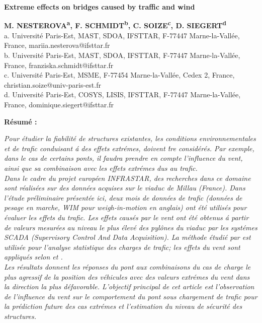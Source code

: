 \documentclass[11pt,a4paper]{article}
\begin{document}



\begin{center}
\begin{spacing}{2.05}
{\fontsize{20}{20}
\bf
Extreme effects on bridges caused by traffic and wind
}
\end{spacing}
\end{center}
\vspace{-1.25cm}
\begin{center}
{\fontsize{14}{20}
\bf
M. NESTEROVA\textsuperscript{a}, F. SCHMIDT\textsuperscript{b}, C. SOIZE\textsuperscript{c}, D. SIEGERT\textsuperscript{d}\\
\bigskip
}
{\fontsize{12}{20}
a. Universit\'e Paris-Est, MAST, SDOA, IFSTTAR, F-77447 Marne-la-Vall\'ee, France, mariia.nesterova@ifsttar.fr\\
b. Universit\'e Paris-Est, MAST, SDOA, IFSTTAR, F-77447 Marne-la-Vall\'ee, France, franziska.schmidt@ifsttar.fr\\
c. Universit\'e Paris-Est, MSME, F-77454 Marne-la-Vall\'ee, Cedex 2, France, christian.soize@univ-paris-est.fr\\
d. Universit\'e Paris-Est, COSYS, LISIS, IFSTTAR, F-77447 Marne-la-Vall\'ee, France, dominique.siegert@ifsttar.fr\\
}
\end{center}

\vspace{10pt}

{\fontsize{16}{20}
\bf
R\'esum\'e :
}
\medskip

\textit{%
Pour \'etudier la fiabilit\'e de structures existantes, les conditions environnementales et de trafic conduisant \'a des effets extr\'emes, doivent \'tre consid\'er\'es. Par exemple, dans le cas de certains ponts, il faudra prendre en compte l'influence du vent, ainsi que sa combinaison avec les effets extr\'emes dus au trafic.\\
Dans le cadre du projet europ\'een INFRASTAR, des recherches dans ce domaine sont r\'ealis\'ees sur des donn\'ees acquises sur le viaduc de Millau (France). Dans l'\'etude pr\'eliminaire pr\'esent\'ee ici, deux mois de donn\'ees de trafic (donn\'ees de pesage en marche, WIM pour weigh-in-motion en anglais) ont \'et\'e utilis\'es pour \'evaluer les effets du trafic. Les effets caus\'es par le vent ont \'et\'e obtenus \'a partir de valeurs mesur\'ees au niveau le plus \'elev\'e des pyl\^ones du viaduc par les syst\'emes SCADA (Supervisory Control And Data Acquisition). La m\'ethode \'etudi\'e par \cite{Zhou2013} est utilis\'ee pour l'analyse statistique des charges de trafic; les effets du vent sont appliqu\'es selon \cite{Zhang2014} et \cite{Arena2014}.\\
Les r\'esultats donnent les r\'eponses du pont aux combinaisons du cas de charge le plus agressif de la position des v\'ehicules avec des valeurs extr\'emes du vent dans la direction la plus d\'efavorable. L'objectif principal de cet article est l'observation de l'influence du vent sur le comportement du pont sous chargement de trafic pour la pr\'ediction future des cas extr\'emes et l'estimation du niveau de s\'ecurit\'e des structures.}
\end{document}
